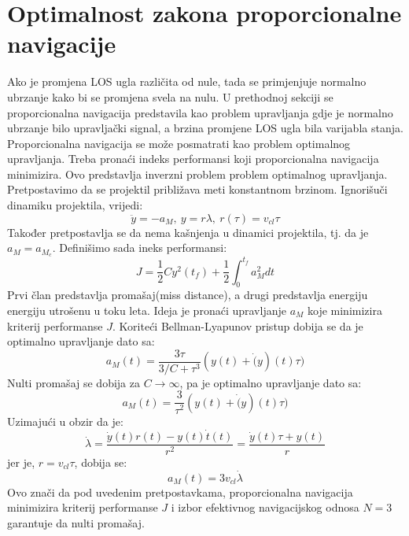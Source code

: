 \section{Optimalnost zakona proporcionalne navigacije}
Ako je promjena LOS ugla različita od nule, tada se primjenjuje normalno ubrzanje kako bi 
se promjena svela na nulu. U prethodnoj sekciji se proporcionalna navigacija predstavila kao 
problem upravljanja gdje je normalno ubrzanje bilo upravljački signal, a brzina promjene LOS ugla bila varijabla stanja.
Proporcionalna navigacija se može posmatrati kao problem optimalnog upravljanja. Treba pronaći indeks performansi koji 
proporcionalna navigacija minimizira. Ovo predstavlja inverzni problem problem optimalnog upravljanja. Pretpostavimo da 
se projektil približava meti konstantnom brzinom. Ignorišuči dinamiku projektila, vrijedi:
\begin{equation}
    \ddot{y}=-a_M,\ y=r\lambda,\ r(\tau)=v_{cl}\tau
\end{equation}
Također pretpostavlja se da nema kašnjenja u dinamici projektila, tj. da je $a_M = a_{M_c}$.
Definišimo sada ineks performansi:
\begin{equation}
    J=\frac{1}{2}Cy^2(t_f)+\frac{1}{2}\int_0^{t_f}{a_M^2dt}
\end{equation}
Prvi član predstavlja promašaj(miss distance), a drugi predstavlja energiju energiju utrošenu u toku leta. Ideja je pronaći upravljanje
$a_M$ koje minimizira kriterij performanse $J$. Koriteći Bellman-Lyapunov pristup dobija se da je 
optimalno upravljanje dato sa:
\begin{equation}
    a_M(t)=\frac{3\tau}{3/C+\tau ^3}(y(t)+\dot(y)(t)\tau)
\end{equation}
Nulti promašaj se dobija za $C\rightarrow \infty$, pa je optimalno upravljanje dato sa:
\begin{equation}
    a_M(t)=\frac{3}{\tau ^2}(y(t)+\dot(y)(t)\tau)
\end{equation}
Uzimajući u obzir da je:
\begin{equation}
    \dot{\lambda} = \frac{\dot{y}(t)r(t)-y(t)\dot{t}(t)}{r^2}=\frac{\dot{y}(t)\tau + y(t)}{r}
\end{equation}
jer je, $r=v_{cl}\tau$, dobija se:
\begin{equation}
    a_M(t)=3v_{cl}\dot{\lambda}
\end{equation}
Ovo znači da pod uvedenim pretpostavkama, proporcionalna navigacija minimizira kriterij performanse
$J$ i izbor efektivnog navigacijskog odnosa $N=3$ garantuje da nulti promašaj. 
